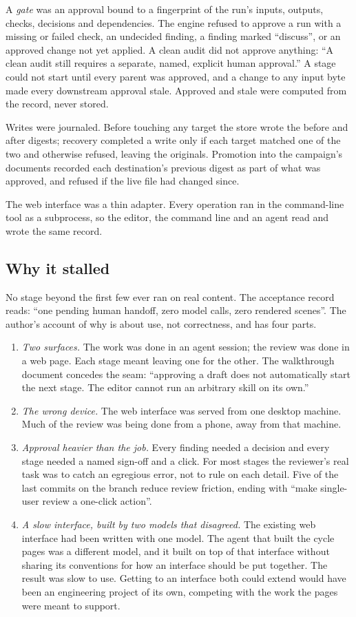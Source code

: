 \documentclass[11pt]{article}
\begin{document}
A \emph{gate} was an approval bound to a fingerprint of the run's inputs, outputs,
checks, decisions and dependencies. The engine refused to approve a run with a missing
or failed check, an undecided finding, a finding marked ``discuss'', or an approved
change not yet applied. A clean audit did not approve anything: ``A clean audit still
requires a separate, named, explicit human approval.'' A stage could not start until
every parent was approved, and a change to any input byte made every downstream approval
stale. Approved and stale were computed from the record, never stored.

Writes were journaled. Before touching any target the store wrote the before and after
digests; recovery completed a write only if each target matched one of the two and
otherwise refused, leaving the originals. Promotion into the campaign's documents
recorded each destination's previous digest as part of what was approved, and refused if
the live file had changed since.

The web interface was a thin adapter. Every operation ran in the command-line tool as a
subprocess, so the editor, the command line and an agent read and wrote the same record.

\subsection{Why it stalled}

No stage beyond the first few ever ran on real content. The acceptance record reads:
``one pending human handoff, zero model calls, zero rendered scenes''. The author's
account of why is about use, not correctness, and has four parts.

\begin{enumerate}[nosep]
\item \emph{Two surfaces.} The work was done in an agent session; the review was done
in a web page. Each stage meant leaving one for the other. The walkthrough document
concedes the seam: ``approving a draft does not automatically start the next stage. The
editor cannot run an arbitrary skill on its own.''
\item \emph{The wrong device.} The web interface was served from one desktop machine.
Much of the review was being done from a phone, away from that machine.
\item \emph{Approval heavier than the job.} Every finding needed a decision and every
stage needed a named sign-off and a click. For most stages the reviewer's real task was
to catch an egregious error, not to rule on each detail. Five of the last commits on
the branch reduce review friction, ending with ``make single-user review a one-click
action''.
\item \emph{A slow interface, built by two models that disagreed.} The existing web
interface had been written with one model. The agent that built the cycle pages was a
different model, and it built on top of that interface without sharing its conventions
for how an interface should be put together. The result was slow to use. Getting to an
interface both could extend would have been an engineering project of its own, competing
with the work the pages were meant to support.
\end{enumerate}
\end{document}
